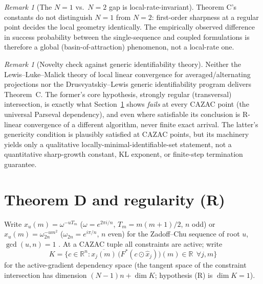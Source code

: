 \documentclass[11pt]{article}
\theoremstyle{plain}
\theoremstyle{definition}
\theoremstyle{remark}
\newtheorem{remark}[theorem]{Remark}
\newcommand{\R}{\mathbb R}
\begin{document}
\begin{remark}[The $N=1$ vs.\ $N=2$ gap is local-rate-invariant]
Theorem C's constants do not distinguish $N=1$ from $N=2$: first-order
sharpness at a regular point decides the local geometry identically. The
empirically observed difference in success probability between the
single-sequence and coupled formulations is therefore a global
(basin-of-attraction) phenomenon, not a local-rate one.
\end{remark}

\begin{remark}[Novelty check against generic identifiability theory]
Neither the Lewis--Luke--Malick theory of local linear convergence for
averaged/alternating projections \cite{LLM09} nor the Drusvyatskiy--Lewis
generic identifiability program \cite{DL12} delivers
Theorem~C. The former's core hypothesis, strongly regular (transversal)
intersection, is exactly what Section~\ref{sec:zc} shows \emph{fails} at
every CAZAC point (the universal Parseval dependency), and even where
satisfiable its conclusion is R-linear convergence of a different
algorithm, never finite exact arrival. The latter's genericity condition is
plausibly satisfied at CAZAC points, but its machinery yields only a
qualitative locally-minimal-identifiable-set statement, not a quantitative
sharp-growth constant, KL exponent, or finite-step termination guarantee.
\end{remark}

\section{Theorem D and regularity (R)}\label{sec:zc}

Write $x_u(m)=\omega^{-uT_m}$ ($\omega=e^{2\pi i/n}$, $T_m=m(m+1)/2$, $n$
odd) or $x_u(m)=\omega_{2n}^{-um^2}$ ($\omega_{2n}=e^{i\pi/n}$, $n$ even)
for the Zadoff--Chu sequence of root $u$, $\gcd(u,n)=1$ \cite{Chu72}. At a
CAZAC tuple all constraints are active; write
$$K=\{c\in\R^n: \overline{x_j(m)}\,\bigl(F^*(c\odot\widehat x_j)\bigr)(m)\in\R\ \ \forall j,m\}$$
for the active-gradient dependency space (the tangent space of the
constraint intersection has dimension $(N-1)n+\dim K$; hypothesis (R) is
$\dim K=1$).
\end{document}
